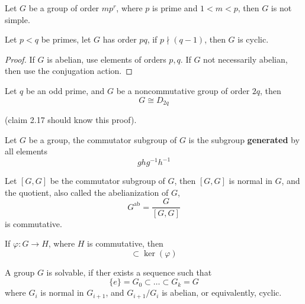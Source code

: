 \documentclass[openany]{book}
\begin{document}
\begin{prop}
    Let $G$ be a group of order $mp^r$, where $p$ is prime and $1<m<p$, then $G$ is not simple.
\end{prop}


\begin{prop}[*]
    Let $p<q$ be primes, let $G$ has order $pq$, if $p\nmid (q-1)$, then $G$ is cyclic.
\end{prop}
\begin{proof}
    If $G$ is abelian, use elements of orders $p,q$. If $G$ not necessarily abelian, then use the conjugation action.
\end{proof}

\begin{prop}[*]
    Let $q$ be an odd prime, and $G$ be a noncommutative group of order $2q$, then 
    \begin{equation*}
        G\cong D_{2q}
    \end{equation*}
\end{prop}
(claim 2.17 should know this proof).

\begin{defn}
    Let $G$ be a group, the commutator subgroup of $G$ is the subgroup \textbf{generated} by all elements 
    \begin{equation*}
        ghg^{-1}h^{-1}
    \end{equation*}
\end{defn}


\begin{prop}
    Let $[G,G]$ be the commutator subgroup of $G$, then $[G,G]$ is normal in $G$, and the quotient, also called the abelianization of $G$, 
    \begin{equation*}
        G^{\text{ab}}=\frac{G}{[G,G]}
    \end{equation*}
    is commutative.

    If $\varphi: G\to H$, where $H$ is commutative, then 
    \begin{equation*}
        [G,G]\subset\ker(\varphi)
    \end{equation*}
\end{prop}
\begin{defn}
    A group $G$ is solvable, if ther exists a sequence such that 
    \begin{equation*}
        \{e\}=G_0\subset\dots\subset G_k=G
    \end{equation*}
    where $G_i$ is normal in $G_{i+1}$, and $G_{i+1}/G_i$ is abelian, or equivalently, cyclic.
\end{defn}
\end{document}
